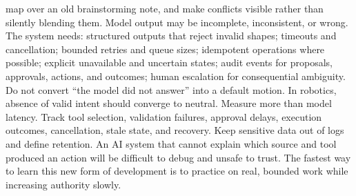 {}map over an old brainstorming note, and make conflicts visible rather than\markdownRendererSoftLineBreak
{}silently blending them.\markdownRendererInterblockSeparator
{}
\markdownRendererSectionEnd \markdownRendererSectionBegin
{}\markdownRendererInterblockSeparator
{}Model output may be incomplete, inconsistent, or wrong. The system needs:\markdownRendererInterblockSeparator
{}\markdownRendererUlBegin
\markdownRendererUlItem structured outputs that reject invalid shapes;\markdownRendererUlItemEnd 
\markdownRendererUlItem timeouts and cancellation;\markdownRendererUlItemEnd 
\markdownRendererUlItem bounded retries and queue sizes;\markdownRendererUlItemEnd 
\markdownRendererUlItem idempotent operations where possible;\markdownRendererUlItemEnd 
\markdownRendererUlItem explicit unavailable and uncertain states;\markdownRendererUlItemEnd 
\markdownRendererUlItem audit events for proposals, approvals, actions, and outcomes;\markdownRendererUlItemEnd 
\markdownRendererUlItem human escalation for consequential ambiguity.\markdownRendererUlItemEnd 
\markdownRendererUlEnd \markdownRendererInterblockSeparator
{}Do not convert “the model did not answer” into a default motion. In robotics,\markdownRendererSoftLineBreak
{}absence of valid intent should converge to neutral.\markdownRendererInterblockSeparator
{}
\markdownRendererSectionEnd \markdownRendererSectionBegin
{}\markdownRendererInterblockSeparator
{}Measure more than model latency. Track tool selection, validation failures,\markdownRendererSoftLineBreak
{}approval delays, execution outcomes, cancellation, stale state, and recovery.\markdownRendererSoftLineBreak
{}Keep sensitive data out of logs and define retention. An AI system that cannot\markdownRendererSoftLineBreak
{}explain which source and tool produced an action will be difficult to debug and\markdownRendererSoftLineBreak
{}unsafe to trust.\markdownRendererInterblockSeparator
{}\markdownRendererThematicBreak{}\markdownRendererInterblockSeparator
{}
\markdownRendererSectionEnd 
\markdownRendererSectionEnd \markdownRendererSectionBegin
{}\markdownRendererInterblockSeparator
{}The fastest way to learn this new form of development is to practice on real,\markdownRendererSoftLineBreak
{}bounded work while increasing authority slowly.\markdownRendererInterblockSeparator
{}\markdownRendererSectionBegin
{}\markdownRendererInterblockSeparator

